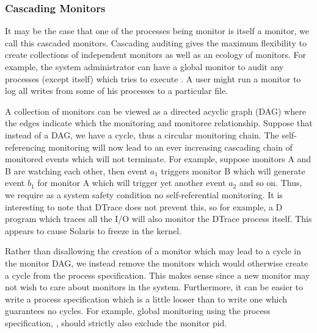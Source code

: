 \subsubsection{Cascading Monitors}
\label{sec:lbox-self}

It may be the case that one of the processes being monitor is
itself a monitor, we call this cascaded monitors.
Cascading auditing gives the maximum flexibility to create 
collections of independent monitors as well as an ecology
of monitors.
For example, the system administrator can have a global monitor to
audit any processes (except itself) which
tries to execute . 
A user might run a monitor to log all writes 
from some of his processes to a particular file.

A collection of monitors can be viewed as a directed acyclic graph (DAG)
where the edges indicate which the monitoring and monitoree relationship.
Suppose that instead of a DAG, we have a cycle, 
thus a circular monitoring chain. 
The self-referencing monitoring will now lead to an ever increasing cascading
chain of monitored events which will not terminate.
For example, suppose monitors A and B are watching each other, then
event $a_1$ triggers monitor B which will generate event $b_1$ for monitor
A which will trigger yet another event $a_2$ and so on.
Thus, we require as a system safety condition no self-referential monitoring.
It is interesting to note that DTrace does not prevent this, so for example,
a D program which traces all the  I/O will also monitor the DTrace
process itself. This appears to cause Solaris to freeze in the kernel.

Rather than disallowing the creation of a monitor which may lead to a cycle
in the monitor DAG, we instead remove the monitors which would otherwise
create a cycle from the process specification.
This makes sense since a new monitor may not wish to care about monitors
in the system. Furthermore, it can be easier to write a process specification
which is a little looser than to write one which guarantees no cycles.
For example, global monitoring using the process specification, ,
should strictly also exclude the monitor pid.


